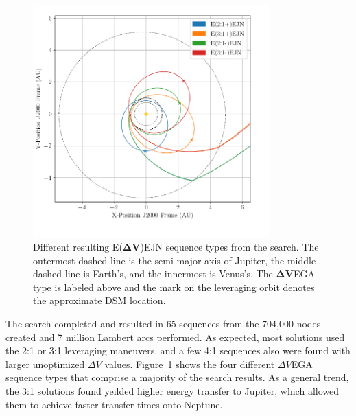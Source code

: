 \documentclass[letterpaper, preprint, paper,11pt]{AAS}	%
\begin{document}
\begin{figure}[ht]
	\centering\includegraphics[width=3.6in]{./fig/tridentMCTS}
	\caption{Different resulting E($\boldsymbol{\Delta V}$)EJN sequence types from the search. The outermost dashed line is the semi-major axis of Jupiter, the middle dashed line is Earth's, and the innermost is Venus's. The $\boldsymbol{\Delta V}$EGA type is labeled above and the mark on the leveraging orbit denotes the approximate DSM location.}
	\label{fig:tridentMCTS}
\end{figure}

The search completed and resulted in 65 sequences from the 704,000 nodes created and 7 million Lambert arcs performed. As expected, most solutions used the 2:1 or 3:1 leveraging maneuvers, and a few 4:1 sequences also were found with larger unoptimized $\Delta V$ values. Figure~\ref{fig:tridentMCTS} shows the four different $\Delta V$EGA sequence types that comprise a majority of the search results. As a general trend, the 3:1 solutions found yeilded higher energy transfer to Jupiter, which allowed them to achieve faster transfer times onto Neptune.
\end{document}
